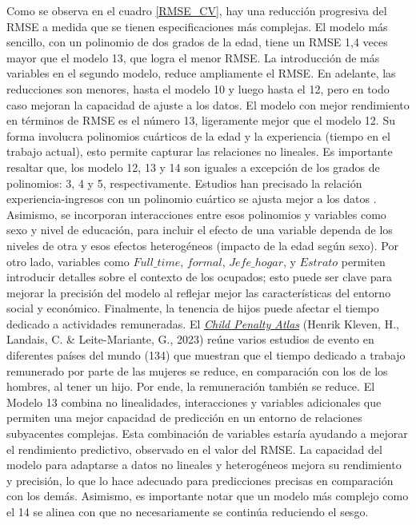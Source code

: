 \documentclass[12pt,a4paper,onecolumn]{article}
\begin{document}
Como se observa en el cuadro \ref{RMSE_CV}, hay una reducción progresiva del RMSE a medida que se tienen especificaciones más complejas. El modelo más sencillo, con un polinomio de dos grados de la edad, tiene un RMSE 1,4 veces mayor que el modelo 13, que logra el menor RMSE. La introducción de más variables en el segundo modelo, reduce ampliamente el RMSE. En adelante, las reducciones son menores, hasta el modelo 10 y luego hasta el 12, pero en todo caso mejoran la capacidad de ajuste a los datos. 
\bigbreak
El modelo con mejor rendimiento en términos de RMSE es el número 13, ligeramente mejor que el modelo 12. Su forma involucra polinomios cuárticos de la edad y la experiencia (tiempo en el trabajo actual), esto permite capturar las relaciones no lineales. Es importante resaltar que, los modelo 12, 13 y 14 son iguales a excepción de los grados de polinomios: 3, 4 y 5, respectivamente. Estudios han precisado la relación experiencia-ingresos con un polinomio cuártico se ajusta mejor a los datos \citep{Lemieux2006}. Asimismo, se incorporan interacciones entre esos polinomios y variables como sexo y nivel de educación, para incluir el efecto de una variable dependa de los niveles de otra y esos efectos heterogéneos (impacto de la edad según sexo). 
 \bigbreak
 Por otro lado, variables como $Full\_time$, $formal$, $Jefe\_hogar$, y $Estrato$ permiten introducir detalles sobre el contexto de los ocupados; esto puede ser clave para mejorar la precisión del modelo al reflejar mejor las características del entorno social y económico. Finalmente, la tenencia de hijos puede afectar el tiempo dedicado a actividades remuneradas. El \href{https://childpenaltyatlas.org/event-studies}{\textit{Child Penalty Atlas}} (Henrik Kleven, H., Landais, C. \& Leite-Mariante, G., 2023) reúne varios estudios de evento en diferentes países del mundo (134) que muestran que el tiempo dedicado a trabajo remunerado por parte de las mujeres se reduce, en comparación con los de los hombres, al tener un hijo. Por ende, la remuneración también se reduce. 
\bigbreak
El Modelo 13 combina no linealidades, interacciones y variables adicionales que permiten una mejor capacidad de predicción en un entorno de relaciones subyacentes complejas. Esta combinación de variables estaría ayudando a mejorar el rendimiento predictivo, observado en el valor del RMSE. La capacidad del modelo para adaptarse a datos no lineales y heterogéneos mejora su rendimiento y precisión, lo que lo hace adecuado para predicciones precisas en comparación con los demás. Asimismo, es importante notar que un modelo más complejo como el 14 se alinea con que no necesariamente se continúa reduciendo el sesgo. 
\end{document}
